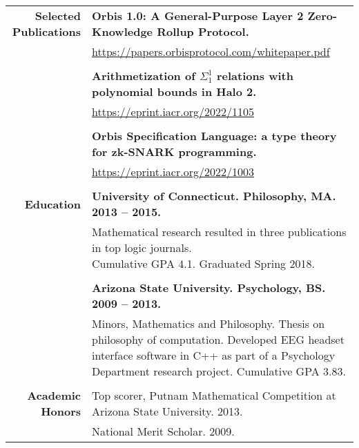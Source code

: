 \documentclass{article}
\begin{document}
\begin{tabular}{rl}
  {\bf Selected Publications}
  & {\bf Orbis 1.0: A General-Purpose Layer 2 Zero-Knowledge Rollup Protocol.} \\
  & {\href{https://papers.orbisprotocol.com/whitepaper.pdf}{https://papers.orbisprotocol.com/whitepaper.pdf}} \\ \\
  & {\bf Arithmetization of $\Sigma^1_1$ relations with polynomial bounds in Halo 2.} \\
  & {\href{https://eprint.iacr.org/2022/1105}{https://eprint.iacr.org/2022/1105}} \\ \\
  & {\bf Orbis Specification Language: a type theory for zk-SNARK programming.} \\
  & {\href{https://eprint.iacr.org/2022/1003}{https://eprint.iacr.org/2022/1003}} \\ \\

  {\bf Education} & {\bf University of Connecticut. Philosophy, MA. 2013 -- 2015.} \\
  & \parbox{4.5in}{Mathematical research resulted in three publications in top logic journals. \\ Cumulative GPA 4.1. Graduated Spring 2018.} \\ \\

  & {\bf Arizona State University. Psychology, BS. 2009 -- 2013.} \\
  & \parbox{4.5in}{Minors, Mathematics and Philosophy. Thesis on philosophy of computation. Developed EEG headset interface software in C++ as part of a Psychology Department research project. Cumulative GPA 3.83.} \\ \\



  {\bf Academic Honors} & Top scorer, Putnam Mathematical Competition at Arizona State University. 2013. \\
   & National Merit Scholar. 2009.
\end{tabular}
\egroup
\end{document}
